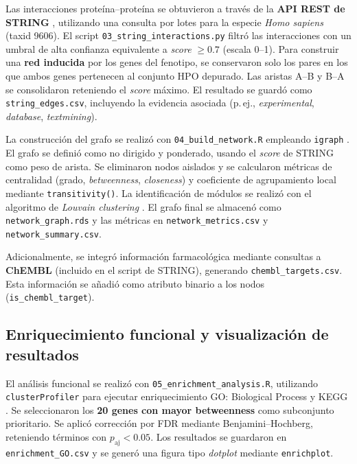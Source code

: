 Las interacciones proteína–proteína se obtuvieron a través de la \textbf{API REST de STRING} \cite{Szklarczyk2019_STRING}, utilizando una consulta por lotes para la especie \textit{Homo sapiens} (taxid 9606). El script \texttt{03\_string\_interactions.py} filtró las interacciones con un umbral de alta confianza equivalente a \textit{score} $\geq 0.7$ (escala 0--1). Para construir una \textbf{red inducida} por los genes del fenotipo, se conservaron solo los pares en los que ambos genes pertenecen al conjunto HPO depurado. Las aristas A--B y B--A se consolidaron reteniendo el \textit{score} máximo. El resultado se guardó como \texttt{string\_edges.csv}, incluyendo la evidencia asociada (p.\,ej., \textit{experimental}, \textit{database}, \textit{textmining}).

La construcción del grafo se realizó con \texttt{04\_build\_network.R} empleando \texttt{igraph} \cite{Csardi2006_igraph}. El grafo se definió como no dirigido y ponderado, usando el \textit{score} de STRING como peso de arista. Se eliminaron nodos aislados y se calcularon métricas de centralidad (grado, \textit{betweenness}, \textit{closeness}) y coeficiente de agrupamiento local mediante \texttt{transitivity()}. La identificación de módulos se realizó con el algoritmo de \textit{Louvain clustering} \cite{Blondel2008_Louvain}. El grafo final se almacenó como \texttt{network\_graph.rds} y las métricas en \texttt{network\_metrics.csv} y \texttt{network\_summary.csv}.

Adicionalmente, se integró información farmacológica mediante consultas a \textbf{ChEMBL} \cite{gaulton2012chembl} (incluido en el script de STRING), generando \texttt{chembl\_targets.csv}. Esta información se añadió como atributo binario a los nodos (\texttt{is\_chembl\_target}).

\subsection{Enriquecimiento funcional y visualización de resultados}

El análisis funcional se realizó con \texttt{05\_enrichment\_analysis.R}, utilizando \texttt{clusterProfiler} \cite{Yu2012_clusterProfiler} para ejecutar enriquecimiento GO: Biological Process \cite{Ashburner2000_GO} y KEGG \cite{Kanehisa2000_KEGG}. Se seleccionaron los \textbf{20 genes con mayor betweenness} como subconjunto prioritario. Se aplicó corrección por FDR mediante Benjamini--Hochberg, reteniendo términos con \(p_{\mathrm{aj}}<0.05\). Los resultados se guardaron en \texttt{enrichment\_GO.csv} y se generó una figura tipo \textit{dotplot} mediante \texttt{enrichplot}.

